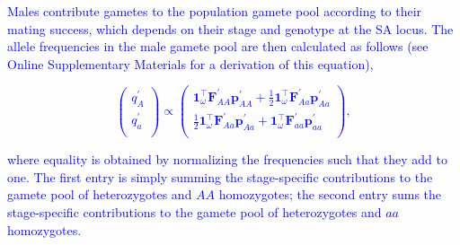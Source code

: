 \documentclass[11pt]{article}
\def\mbf#1{\mathbf{#1}}
\begin{document}
\textcolor{blue}{Males contribute  gametes to the population gamete pool according to their mating success, which depends on their stage and genotype at the SA locus. The allele frequencies in the male gamete pool are then calculated as follows (see Online Supplementary Materials for a derivation of this equation),
\begin{linenomath*}
\begin{equation} \label{eq:maleGametePool}
	\left(
		\begin{array}{c}
			q^{\prime}_{A} \\
			q^{\prime}_{a} \\
		\end{array} \right) \propto 
				\left(
		\begin{array}{c}
			\mbf{1}^{\intercal}_{\omega}\mbf{F}^{\prime}_{AA}\mbf{p}^{\prime}_{AA}+ \frac{1}{2} \mbf{1}^{\intercal}_{\omega}  \mbf{F}^{\prime}_{Aa} \mbf{p}^{\prime}_{Aa}  \\
		\frac{1}{2} \mbf{1}^{\intercal}_{\omega}  \mbf{F}^{\prime}_{Aa} \mbf{p}^{\prime}_{Aa} + \mbf{1}^{\intercal}_{\omega}\mbf{F}^{\prime}_{aa}\mbf{p}^{\prime}_{aa}\\
		\end{array} \right),
\end{equation}
\end{linenomath*}
where equality is obtained by normalizing the frequencies such that they add to one. The first entry is simply summing the stage-specific contributions to the gamete pool of heterozygotes and $AA$ homozygotes; the second entry sums the stage-specific contributions to the gamete pool of heterozygotes and $aa$ homozygotes. }
\end{document}

